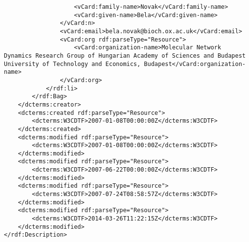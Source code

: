 \begin{mdframed}[style=mddefault,frametitle={Meta Data of the Publication \texttt{Calzone2007.pdf}}]
\begin{verbatim}
					<vCard:family-name>Novak</vCard:family-name>
					<vCard:given-name>Bela</vCard:given-name>
				</vCard:n>
				<vCard:email>bela.novak@bioch.ox.ac.uk</vCard:email>
				<vCard:org rdf:parseType="Resource">
					<vCard:organization-name>Molecular Network Dynamics Research Group of Hungarian Academy of Sciences and Budapest University of Technology and Economics, Budapest</vCard:organization-name>
				</vCard:org>
			</rdf:li>
		</rdf:Bag>
	</dcterms:creator>
	<dcterms:created rdf:parseType="Resource">
		<dcterms:W3CDTF>2007-01-08T00:00:00Z</dcterms:W3CDTF>
	</dcterms:created>
	<dcterms:modified rdf:parseType="Resource">
		<dcterms:W3CDTF>2007-01-08T00:00:00Z</dcterms:W3CDTF>
	</dcterms:modified>
	<dcterms:modified rdf:parseType="Resource">
		<dcterms:W3CDTF>2007-06-22T00:00:00Z</dcterms:W3CDTF>
	</dcterms:modified>
	<dcterms:modified rdf:parseType="Resource">
		<dcterms:W3CDTF>2007-07-24T08:58:57Z</dcterms:W3CDTF>
	</dcterms:modified>
	<dcterms:modified rdf:parseType="Resource">
		<dcterms:W3CDTF>2014-03-26T11:22:15Z</dcterms:W3CDTF>
	</dcterms:modified>
</rdf:Description>
\end{verbatim}
\end{mdframed}
